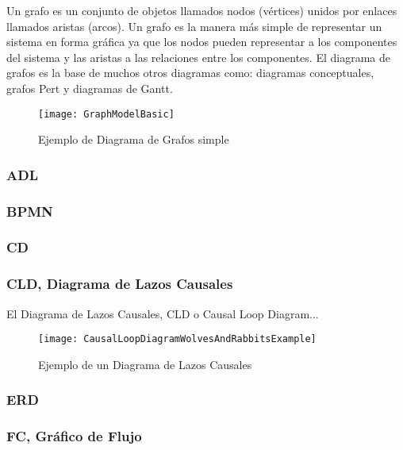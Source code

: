 Un grafo es un conjunto de objetos llamados nodos (vértices) unidos por enlaces llamados aristas (arcos). Un grafo es la manera más simple de representar un sistema en forma gráfica ya que los nodos pueden representar a los componentes del sistema y las aristas a las relaciones entre los componentes. El diagrama de grafos es la base de muchos otros diagramas como: diagramas conceptuales, grafos Pert y diagramas de Gantt.

\begin{figure}[h]
  \centering
  \texttt{[image: GraphModelBasic]}
  \caption{Ejemplo de Diagrama de Grafos simple}
  \centering
  \label{fig:GraphModelBasic} %
\end{figure}


\subsubsection{ADL}

\subsubsection{BPMN}

\subsubsection{CD}

\subsubsection{CLD, Diagrama de Lazos Causales}
El Diagrama de Lazos Causales, CLD o Causal Loop Diagram...

\begin{figure}[h]
  \centering
  \texttt{[image: CausalLoopDiagramWolvesAndRabbitsExample]}
  \caption{Ejemplo de un Diagrama de Lazos Causales}
  \centering
  \label{fig:v} %
\end{figure}

\subsubsection{ERD}

\subsubsection{FC, Gráfico de Flujo}

